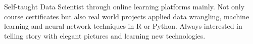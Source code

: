 

\begin{cvparagraph}

Self-taught Data Scientist through online learning platforms mainly. Not only course certificates but also real world projects applied data wrangling, machine learning and neural network techniques in R or Python. Always interested in telling story with elegant pictures and learning new technologies.
\end{cvparagraph}
